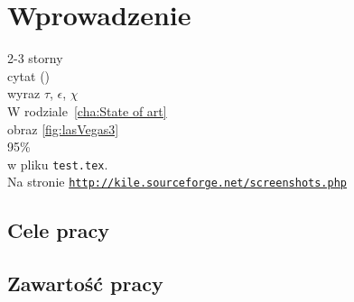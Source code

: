 \chapter{Wprowadzenie}
\label{cha:wprowadzenie}

2-3 storny\\
cytat (\cite{JsonXmlComp})\\
wyraz $\tau$, $\epsilon$, $\chi$\\
W rodziale~\ref{cha:State of art}\\
obraz \ref{fig:lasVegas3}\\
95\%\\
w pliku \texttt{test.tex}.\\
Na stronie \underline{\texttt{http://kile.sourceforge.net/screenshots.php}}\\

\section{Cele pracy}
\label{sec:celePracy}


\section{Zawartość pracy}
\label{sec:zawartoscPracy}



















